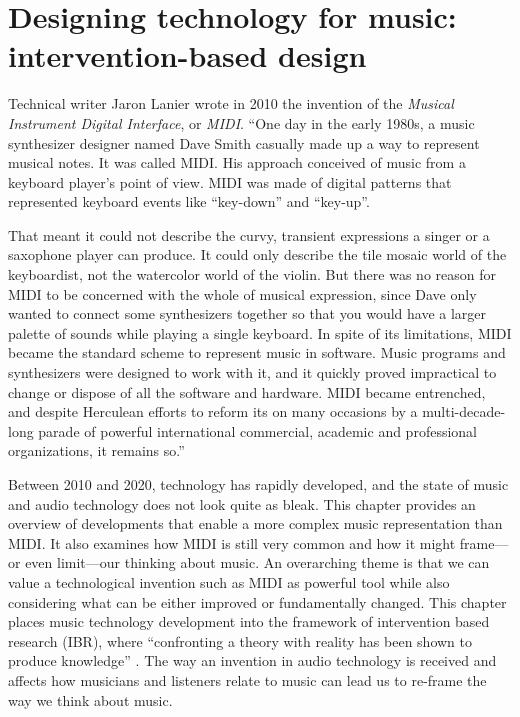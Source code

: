 \chapter{Designing technology for music: intervention-based design}
\label{chap:ibr}
Technical writer Jaron Lanier wrote in 2010 the invention of the \textit{Musical Instrument Digital Interface}, or \textit{MIDI}. ``One day in the early 1980s, a music synthesizer designer named Dave Smith casually made up a way to represent musical notes. It was called MIDI. His approach conceived of music from a keyboard player's point of view. MIDI was made of digital patterns that represented keyboard events like ``key-down'' and ``key-up''. 

That meant it could not describe the curvy, transient expressions a singer or a saxophone player can produce. It could only describe the tile mosaic world of the keyboardist, not the watercolor world of the violin. But there was no reason for MIDI to be concerned with the whole of musical expression, since Dave only wanted to connect some synthesizers together so that you would have a larger palette of sounds while playing a single keyboard. In spite of its limitations, MIDI became the standard scheme to represent music in software. Music programs and synthesizers were designed to work with it, and it quickly proved impractical to change or dispose of all the software and hardware. MIDI became entrenched, and despite Herculean efforts to reform its on many occasions by a multi-decade-long parade of powerful international commercial, academic and professional organizations, it remains so.'' \cite{lanier2010you}

Between 2010 and 2020, technology has rapidly developed, and the state of music and audio technology does not look quite as bleak. This chapter provides an overview of developments that enable a more complex music representation than MIDI. It also examines how MIDI is still very common and how it might frame---or even limit---our thinking about music. An overarching theme is that we can value a technological invention such as MIDI as powerful tool while also considering what can be either improved or fundamentally changed. This chapter places music technology development into the framework of intervention based research (IBR), where ``confronting a theory with reality has been shown to produce knowledge'' \cite{chandrasekaran2020ibr}. The way an invention in audio technology is received and affects how musicians and listeners relate to music can lead us to re-frame the way we think about music.

